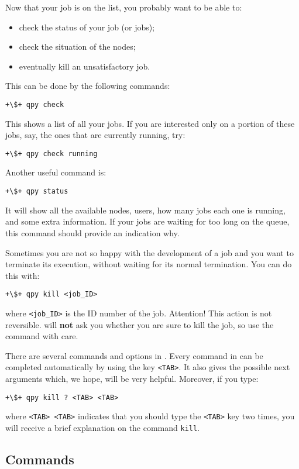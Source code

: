 \documentclass[a4paper,12pt]{article}
\begin{document}
Now that your job is on the list, you probably want to be able to:
\begin{itemize}
\item check the status of your job (or jobs);
\item check the situation of the nodes;
\item eventually kill an unsatisfactory job.
\end{itemize}
This can be done by the following commands:
\begin{lstlisting}[style=BashStyle]
+\$+ qpy check
\end{lstlisting}
This shows a list of all your jobs.
If you are interested only on a portion of these jobs, say, the ones that are currently running, try:
\begin{lstlisting}[style=BashStyle]
+\$+ qpy check running
\end{lstlisting}
Another useful \qpy{} command is:
\begin{lstlisting}[style=BashStyle]
+\$+ qpy status
\end{lstlisting}
It will show all the available nodes, users, how many jobs each one is running, and some extra information.
If your jobs are waiting for too long on the queue, this command should provide an indication why.

Sometimes you are not so happy with the development of a job and you want to terminate its execution, without waiting for its normal termination.
You can do this with:
\begin{lstlisting}[style=BashStyle]
+\$+ qpy kill <job_ID>
\end{lstlisting}
where \texttt{<job\_ID>} is the ID number of the job.
Attention! This action is not reversible.
\qpy{} will \textbf{not} ask you whether you are sure to kill the job, so use the command with care.

There are several commands and options in \qpy{}.
Every command in \qpy{} can be completed automatically by using the key \texttt{<TAB>}.
It also gives the possible next arguments which, we hope, will be very helpful.
Moreover, if you type:
\begin{lstlisting}[style=BashStyle]
+\$+ qpy kill ? <TAB> <TAB>
\end{lstlisting}
where \texttt{<TAB> <TAB>} indicates that you should type the \texttt{<TAB>} key two times, you will receive a brief explanation on the command \texttt{kill}.

\subsection{Commands}\label{sec:user_commands}
\end{document}
